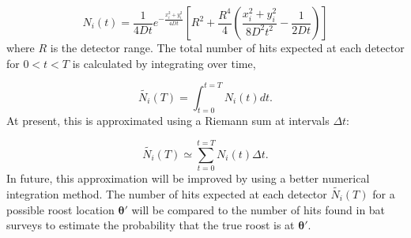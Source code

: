 \begin{equation}
  N_i(t) = \frac{1}{4Dt} e^{-\frac{x_i^2 + y_i^2}{4Dt}} \left[ R^2 + \frac{R^4}{4} \left( \frac{x_i^2 + y_i^2}{8D^2t^2} - \frac{1}{2Dt} \right)\right]
\end{equation}
%
where $R$ is the detector range. The total number of hits expected at each
detector for $0 < t < T$ is calculated by integrating over time,

\begin{equation}
  \tilde{N_i}(T) = \int_{t=0}^{t=T} N_i(t) dt.
\end{equation}
%
At present, this is approximated using a Riemann sum at intervals $\Delta t$:

\begin{equation}
  \tilde{N_i}(T) \simeq \sum_{t=0}^{t=T} N_i(t) \Delta t.
  \label{eqn:expect_hits}
\end{equation}
%
In future, this approximation will be improved by using a better numerical
integration method. The number of hits expected at each detector $\tilde{N_i}(T)$ for a possible roost location $\bm{\theta'}$ will be compared to the number of hits found in bat surveys to estimate the probability that the true roost is at $\bm{\theta'}$.
